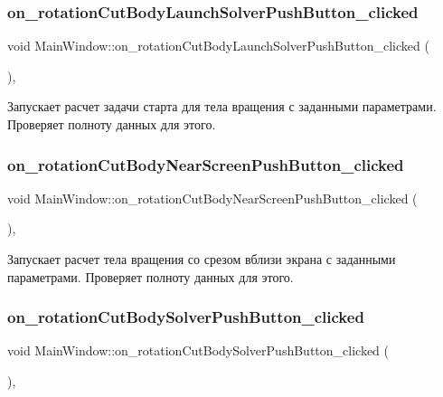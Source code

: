 \subsubsection{\texorpdfstring{on\+\_\+rotation\+Cut\+Body\+Launch\+Solver\+Push\+Button\+\_\+clicked}{on\_rotationCutBodyLaunchSolverPushButton\_clicked}}
{\footnotesize\ttfamily void Main\+Window\+::on\+\_\+rotation\+Cut\+Body\+Launch\+Solver\+Push\+Button\+\_\+clicked (\begin{DoxyParamCaption}{ }\end{DoxyParamCaption})\hspace{0.3cm}{\ttfamily [private]}, {\ttfamily [slot]}}

Запускает расчет задачи старта для тела вращения с заданными параметрами. Проверяет полноту данных для этого. \mbox{\label{class_main_window_a2529d60ec2858b6150222fdf70579bac}} 
\subsubsection{\texorpdfstring{on\+\_\+rotation\+Cut\+Body\+Near\+Screen\+Push\+Button\+\_\+clicked}{on\_rotationCutBodyNearScreenPushButton\_clicked}}
{\footnotesize\ttfamily void Main\+Window\+::on\+\_\+rotation\+Cut\+Body\+Near\+Screen\+Push\+Button\+\_\+clicked (\begin{DoxyParamCaption}{ }\end{DoxyParamCaption})\hspace{0.3cm}{\ttfamily [private]}, {\ttfamily [slot]}}

Запускает расчет тела вращения со срезом вблизи экрана с заданными параметрами. Проверяет полноту данных для этого. \mbox{\label{class_main_window_a9f384827fc7fce8088470694b45059cd}} 
\subsubsection{\texorpdfstring{on\+\_\+rotation\+Cut\+Body\+Solver\+Push\+Button\+\_\+clicked}{on\_rotationCutBodySolverPushButton\_clicked}}
{\footnotesize\ttfamily void Main\+Window\+::on\+\_\+rotation\+Cut\+Body\+Solver\+Push\+Button\+\_\+clicked (\begin{DoxyParamCaption}{ }\end{DoxyParamCaption})\hspace{0.3cm}{\ttfamily [private]}, {\ttfamily [slot]}}

